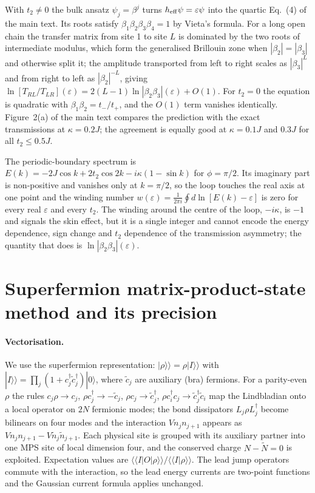 \documentclass[aps,prl,superscriptaddress,nofootinbib,onecolumn,notitlepage,11pt]{revtex4-2}
\newcommand{\heff}{h_{\rm eff}}
\begin{document}
With $t_2\neq0$ the bulk ansatz $\psi_j=\beta^j$ turns $\heff\psi=\varepsilon\psi$ into the quartic Eq.~(4) of the main text. Its roots satisfy $\beta_1\beta_2\beta_3\beta_4=1$ by Vieta's formula. For a long open chain the transfer matrix from site 1 to site $L$ is dominated by the two roots of intermediate modulus, which form the generalised Brillouin zone when $|\beta_2|=|\beta_3|$ and otherwise split it; the amplitude transported from left to right scales as $|\beta_3|^{L}$ and from right to left as $|\beta_2|^{-L}$, giving $\ln[T_{RL}/T_{LR}](\varepsilon)=2(L-1)\ln|\beta_2\beta_3|(\varepsilon)+O(1)$. For $t_2=0$ the equation is quadratic with $\beta_1\beta_2=t_-/t_+$, and the $O(1)$ term vanishes identically. Figure~2(a) of the main text compares the prediction with the exact transmissions at $\kappa=0.2J$; the agreement is equally good at $\kappa=0.1J$ and $0.3J$ for all $t_2\le0.5J$.

The periodic-boundary spectrum is $E(k)=-2J\cos k+2t_2\cos2k-i\kappa(1-\sin k)$ for $\phi=\pi/2$. Its imaginary part is non-positive and vanishes only at $k=\pi/2$, so the loop touches the real axis at one point and the winding number $w(\varepsilon)=\frac{1}{2\pi i}\oint d\ln[E(k)-\varepsilon]$ is zero for every real $\varepsilon$ and every $t_2$. The winding around the centre of the loop, $-i\kappa$, is $-1$ and signals the skin effect, but it is a single integer and cannot encode the energy dependence, sign change and $t_2$ dependence of the transmission asymmetry; the quantity that does is $\ln|\beta_2\beta_3|(\varepsilon)$.

\section{Superfermion matrix-product-state method and its precision}
\label{sec:mps}

\paragraph{Vectorisation.}
We use the superfermion representation: $|\rho\rangle\!\rangle=\rho|I\rangle\!\rangle$ with $|I\rangle\!\rangle=\prod_j(1+c_j^\dagger\tilde c_j^\dagger)|0\rangle$, where $\tilde c_j$ are auxiliary (bra) fermions. For a parity-even $\rho$ the rules $c_j\rho\to c_j$, $\rho c_j^\dagger\to-\tilde c_j$, $\rho c_j\to\tilde c_j^\dagger$, $\rho c_i^\dagger c_j\to\tilde c_j^\dagger\tilde c_i$ map the Lindbladian onto a local operator on $2N$ fermionic modes; the bond dissipators $L_j\rho L_j^\dagger$ become bilinears on four modes and the interaction $Vn_jn_{j+1}$ appears as $V n_jn_{j+1}-V\tilde n_j\tilde n_{j+1}$. Each physical site is grouped with its auxiliary partner into one MPS site of local dimension four, and the conserved charge $N-\tilde N=0$ is exploited. Expectation values are $\langle\!\langle I|O|\rho\rangle\!\rangle/\langle\!\langle I|\rho\rangle\!\rangle$. The lead jump operators commute with the interaction, so the lead energy currents are two-point functions and the Gaussian current formula applies unchanged.
\end{document}
